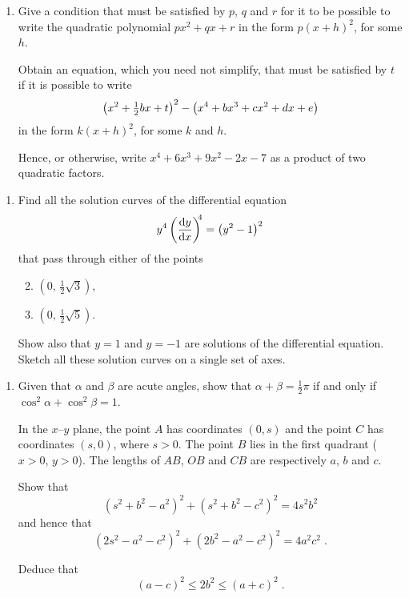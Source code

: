 \documentclass[a4, 11pt]{report}
\newlength{\qspace}
\newcounter{qnumber}
\newenvironment{question}%
 {\vspace{\qspace}
  \begin{enumerate}[\bfseries 1\quad][10]%
    \setcounter{enumi}{\value{qnumber}}%
    \item%
 }
{
  \end{enumerate}
  \filbreak
  \stepcounter{qnumber}
 }
\newenvironment{questionparts}[1][1]%
 {
  \begin{enumerate}[\bfseries (i)]%
    \setcounter{enumii}{#1}
    \addtocounter{enumii}{-1}
    \setlength{\itemsep}{5mm}
    \setlength{\parskip}{8pt}
 }
 {
  \end{enumerate}
 }
\def\le{\leqslant}
\def\l{\left(}
\def\r{\right)}
\begin{document}
\begin{question}
Give a condition that must be satisfied by  $p$, $q$ and $r$ for it 
to be possible to write the quadratic polynomial 
$px^2 + qx + r$ in the form $p \l x + h \r^2$, for some $h$.

Obtain  an equation, which you need not simplify,
that  must be satisfied by $t$ if it is possible to write 
\[
\l x^2 + \textstyle{{1 \over 2}} bx + t \r^2 - \l x^4 + bx^3 + cx^2 +dx +e \r 
\]
in the form $k \l x + h \r^2$, for some $k$ and $h$. 

Hence, or otherwise, write $x^4 + 6x^3 + 9x^2 -2x -7$ as a product of two quadratic factors.
	\end{question}
	
\begin{question}
Find all the solution curves of the differential equation
\[
y^4 \l {\mathrm{d}y \over \mathrm{d}x }\r^{\! \! 4} = \l y^2 - 1 \r^2
\]
that  pass through either of the points
\begin{questionparts}
\item $\l 0, \, \frac{1}{2}\sqrt3 \r$,
\item $\l 0, \, \frac{1}{2}\sqrt5 \r$.
\end{questionparts}
Show also that $y = 1$ and $y = -1$ are solutions of the differential equation.
Sketch all these solution curves on a single set of axes.

\end{question}
	
\begin{question}
Given that  $\alpha$ and $\beta$ are acute angles,  show that
$\alpha + \beta = \tfrac{1}{2}\pi$ if and only if $\cos^2 \alpha + \cos^2 \beta = 1$.

In the $x$--$y$ plane, the point $A$ has coordinates $(0,s)$ and the point
$C$ has coordinates $(s,0)$, where $s>0$. The point $B$ lies in the 
first quadrant ($x>0$, $y>0$). The lengths of $AB$, $OB$ and $CB$
are respectively $a$, $b$ and $c$.

Show that
\[
(s^2 +b^2 - a^2)^2 + (s^2 +b^2 -c^2)^2 = 4s^2b^2
\]
and hence that
\[
(2s^2 -a^2-c^2)^2 + (2b^2 -a^2-c^2)^2 =4a^2c^2\;.
\]


Deduce that
$$
\l a - c \r^2 \le 2b^2 \le \l a + c \r^2\;. 
$$


\end{question}
		
\end{document}
